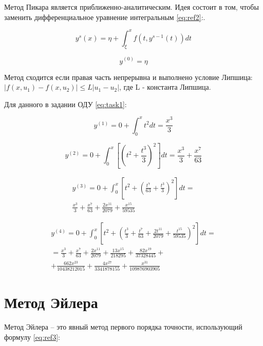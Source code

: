 \documentclass[12pt]{report}
\begin{document}
Метод Пикара является приближенно-аналитическим. Идея состоит в том, чтобы заменить дифференциальное уравнение интегральным \ref{eq:ref2}:.


\begin{equation}
	y^{s}(x) = \eta + \int_{\xi}^{x} f(t, y^{s-1}(t)) dt
	\label{eq:ref2}
\end{equation}

\begin{equation}
	y^{(0)} = \eta
\end{equation}

Метод сходится если правая часть непрерывна и выполнено условие Липшица: $|f(x, u_1) - f(x, u_2)| \leq L |u_1-u_2|$, где L - константа Липшица. 

Для данного в задании ОДУ \ref{eq:task1}:

\begin{equation}
	y^{(1)} = 0 + \int_{0}^{x} t^2 dt= \frac{x^3}{3} 
\end{equation}

\begin{equation}
	y^{(2)} = 0 + \int_{0}^{x}\left[ \left( t^2 + \frac{t^3}{3} \right)^2 \right] dt = \frac{x^3}{3} + \frac{x^7}{63}
\end{equation}

\begin{equation}
	\begin{split}
		y^{(3)} = 0 + \int_{0}^{x}\left[t^2 + \left(\frac{t^7}{63} + \frac{t^3}{3} \right)^2\right] dt = \\ 
		\frac{x^3}{3} + \frac{x^7}{63} + \frac{2x^{11}}{2079} + \frac{x^{15}}{59535}
	\end{split}
\end{equation}

\begin{equation}
	\begin{split}
		y^{(4)} = 0 + \int_{0}^{x}\left[t^2 + \left( \frac{t^3}{3} + \frac{t^7}{63} + \frac{2t^{11}}{2079} + \frac{t^{15}}{59535} \right)^2 \right] dt = \\ 
		= \frac{x^3}{3} + \frac{x^{7}}{63} + \frac{2x^{11}}{2079} + \frac{13x^{15}}{218295} + \frac{82x^{19}}{37328445} + \\
		+ \frac{662x^{23}}{10438212015} + \frac{4x^{27}}{3341878155} + \frac{x^{31}}{109876903905}
	\end{split}
\end{equation}

\section{Метод Эйлера}
Метод Эйлера -- это явный метод первого порядка точности, использующий формулу \ref{eq:ref3}:
\end{document}
